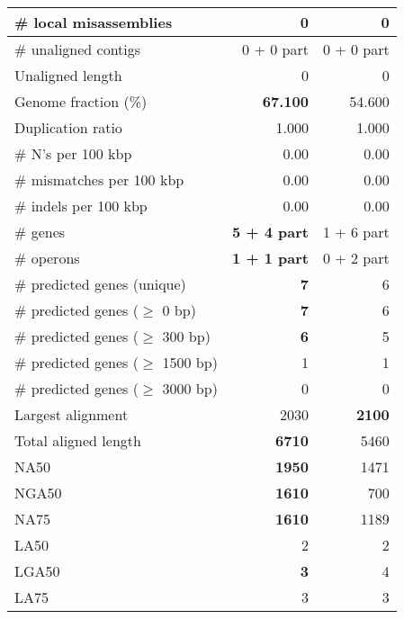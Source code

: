 \documentclass[12pt,a4paper]{article}
\begin{document}
\begin{table}[ht]
\begin{center}
\begin{tabular}{|l*{2}{|r}|}
\# local misassemblies & 0 & 0 \\ \hline
\# unaligned contigs & 0 + 0 part & 0 + 0 part \\ \hline
Unaligned length & 0 & 0 \\ \hline
Genome fraction (\%) & {\bf 67.100} & 54.600 \\ \hline
Duplication ratio & 1.000 & 1.000 \\ \hline
\# N's per 100 kbp & 0.00 & 0.00 \\ \hline
\# mismatches per 100 kbp & 0.00 & 0.00 \\ \hline
\# indels per 100 kbp & 0.00 & 0.00 \\ \hline
\# genes & {\bf 5 + 4 part} & 1 + 6 part \\ \hline
\# operons & {\bf 1 + 1 part} & 0 + 2 part \\ \hline
\# predicted genes (unique) & {\bf 7} & 6 \\ \hline
\# predicted genes ($\geq$ 0 bp) & {\bf 7} & 6 \\ \hline
\# predicted genes ($\geq$ 300 bp) & {\bf 6} & 5 \\ \hline
\# predicted genes ($\geq$ 1500 bp) & 1 & 1 \\ \hline
\# predicted genes ($\geq$ 3000 bp) & 0 & 0 \\ \hline
Largest alignment & 2030 & {\bf 2100} \\ \hline
Total aligned length & {\bf 6710} & 5460 \\ \hline
NA50 & {\bf 1950} & 1471 \\ \hline
NGA50 & {\bf 1610} & 700 \\ \hline
NA75 & {\bf 1610} & 1189 \\ \hline
LA50 & 2 & 2 \\ \hline
LGA50 & {\bf 3} & 4 \\ \hline
LA75 & 3 & 3 \\ \hline
\end{tabular}
\end{center}
\end{table}
\end{document}
